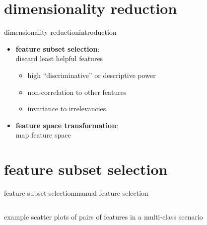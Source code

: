     \section[reduction]{dimensionality reduction}
		\begin{frame}{dimensionality reduction}{introduction}
			\begin{itemize}
				\item	\textbf{feature subset selection}:\\ discard least helpful features
                    \pause
                    \begin{itemize}
                        \item	high ``discriminative'' or descriptive power
                        \item	non-correlation to other features
                        \item	invariance to irrelevancies
                    \end{itemize}
				\bigskip
				\item<2->	\textbf{feature space transformation}:\\ map feature space
			\end{itemize}
		\end{frame}
        
    \section[selection]{feature subset selection}
		\begin{frame}{feature subset selection}{manual feature selection}
            \begin{columns}[T]
                example scatter plots of pairs of features in a multi-class scenario
            \end{columns}
		\end{frame}
        
